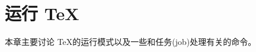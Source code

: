 \documentclass{book}
\begin{document}
\chapter{运行 \TeX}\label{run}

本章主要讨论 \TeX 的运行模式以及一些和任务(job)处理有关的命令。

\label{cschap:everyjob}\label{cschap:jobname}\label{cschap:end}\label{cschap:bye}\label{cschap:pausing}\label{cschap:errorstopmode}\label{cschap:scrollmode}\label{cschap:nonstopmode}\label{cschap:batchmode}
\end{document}
